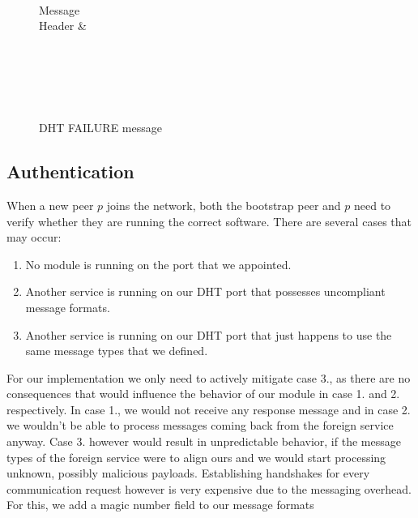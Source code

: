 \documentclass[a4paper, 11pt]{article}
\begin{document}
\begin{figure}[h!]
	\centering
	\begin{bytefield}[bitwidth=0.8em]{32}
		 \\
		\begin{rightwordgroup}{Message \\  Header}
			 & 
		\end{rightwordgroup} \\
		 \\
		\skippedwords \\
		 \\
	\end{bytefield}
	\caption{DHT FAILURE message}
	\label{DHTFAILURE}
\end{figure}

\subsection*{Authentication}
When a new peer $p$ joins the network, both the bootstrap peer and $p$ need to verify whether they are running the correct software. There are several cases that may occur:
\begin{enumerate}
	\item No module is running on the port that we appointed.
	\item Another service is running on our DHT port that possesses uncompliant message formats.
	\item Another service is running on our DHT port that just happens to use the same message types that we defined.
\end{enumerate}

For our implementation we only need to actively mitigate case 3., as there are no consequences that would influence the behavior of our module in case 1. and 2. respectively. In case 1., we would not receive any response message and in case 2. we wouldn't be able to process messages coming back from the foreign service anyway. Case 3. however would result in unpredictable behavior, if the message types of the foreign service were to align ours and we would start processing unknown, possibly malicious payloads. Establishing handshakes for every communication request however is very expensive due to the messaging overhead. For this, we add a magic number field to our message formats 
\end{document}
